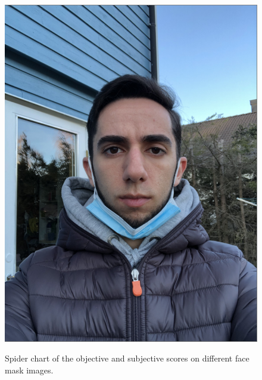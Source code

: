 \begin{figure}[h]
        {\includegraphics[scale = 0.09]{figures/1152.png}\hspace{0.4cm}}
    \caption{Spider chart of the objective and subjective scores on different face mask images.}
    \label{fig:spiderMask}
\end{figure}

